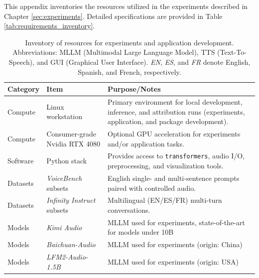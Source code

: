 \begin{appendices}
    This appendix inventories the resources utilized in the experiments described in Chapter \ref{sec:experiments}. Detailed specifications are provided in Table \ref{tab:requirements_inventory}.

    \begin{table}[htbp]
    \renewcommand{\arraystretch}{1.1}
    \centering
    \caption{Inventory of resources for experiments and application development. Abbreviations: MLLM (Multimodal Large Language Model), TTS (Text-To-Speech), and GUI (Graphical User Interface). \textit{EN}, \textit{ES}, and \textit{FR} denote English, Spanish, and French, respectively.}
    \begin{tabular}{m{1.8cm} m{4cm} m{8cm}}

    \toprule

    \textbf{Category} & \textbf{Item} & \textbf{Purpose/Notes} \\

    \midrule

    Compute     & Linux workstation              & Primary environment for local development, inference, and attribution runs (experiments, application, and package development). \\

    Compute     & Consumer-grade Nvidia RTX 4080 & Optional GPU acceleration for experiments and/or application tasks. \\

    Software    & Python stack                   & Provides access to \texttt{transformers}, audio I/O, preprocessing, and visualization tools. \\

    Datasets    & \textit{VoiceBench} subsets    & English single- and multi-sentence prompts paired with controlled audio. \\

    Datasets    & \textit{Infinity Instruct} subsets & Multilingual (EN/ES/FR) multi-turn conversations. \\

    Models    & \textit{Kimi Audio} & MLLM used for experiments, state-of-the-art for models under 10B \\

    Models    & \textit{Baichuan-Audio} & MLLM used for experiments (origin: China) \\

    Models    & \textit{LFM2-Audio-1.5B} & MLLM used for experiments (origin: USA) \\


\end{tabular}
\end{table}
\end{appendices}

